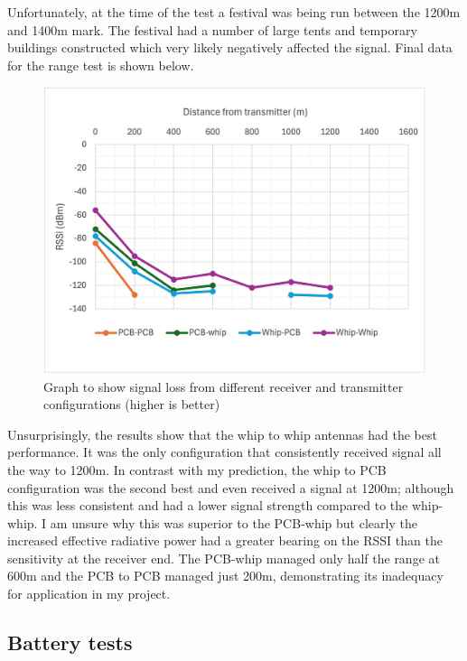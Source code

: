 Unfortunately, at the time of the test a festival was being run between the
1200m and 1400m mark. The festival had a number of large tents and temporary
buildings constructed which very likely negatively affected the signal. Final
data for the range test is shown below.

\begin{figure}[H]
    \centering
    \includegraphics[width=1\textwidth]{contents/part-2/fig2/distance-graph.jpg}
    \caption{Graph to show signal loss from different receiver and transmitter configurations (higher is better)}
    \label{fig:range-test-graph}
\end{figure}

Unsurprisingly, the results show that the whip to whip antennas had the best
performance. It was the only configuration that consistently received signal all
the way to 1200m. In contrast with my prediction, the whip to PCB configuration
was the second best and even received a signal at 1200m; although this was less
consistent and had a lower signal strength compared to the whip-whip. I am
unsure why this was superior to the PCB-whip but clearly the increased effective
radiative power had a greater bearing on the RSSI than the sensitivity at the
receiver end. The PCB-whip managed only half the range at 600m and the PCB to
PCB managed just 200m, demonstrating its inadequacy for application in my
project.

\subsection{Battery tests}\label{sec:battery-tests}

